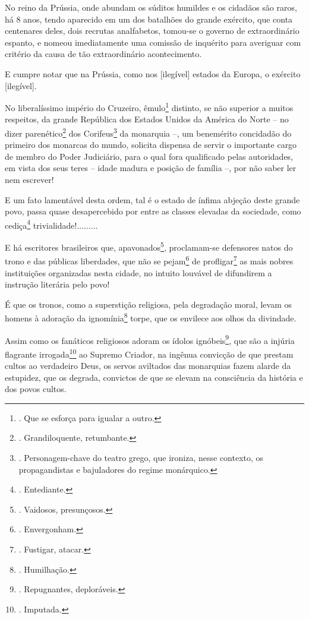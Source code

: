 No reino da Prússia, onde abundam os súditos humildes e os cidadãos são
raros, há 8 anos, tendo aparecido em um dos batalhões do grande
exército, que conta centenares deles, dois recrutas analfabetos,
tomou-se o governo de extraordinário espanto, e nomeou imediatamente uma
comissão de inquérito para averiguar com critério da causa de tão
extraordinário acontecimento.

E cumpre notar que na Prússia, como nos {[}ilegível{]} estados da
Europa, o exército {[}ilegível{]}.

No liberalíssimo império do Cruzeiro, êmulo\footnote{. Que se esforça
  para igualar a outro.} distinto, se não superior a muitos respeitos,
da grande República dos Estados Unidos da América do Norte -- no dizer
parenético\footnote{. Grandiloquente, retumbante.} dos
Corifeus\footnote{. Personagem-chave do teatro grego, que ironiza, nesse
  contexto, os propagandistas e bajuladores do regime monárquico.} da
monarquia --, um benemérito concidadão do primeiro dos monarcas do
mundo, solicita dispensa de servir o importante cargo de membro do Poder
Judiciário, para o qual fora qualificado pelas autoridades, em vista dos
seus teres -- idade madura e posição de família --, por não saber ler
nem escrever!

E um fato lamentável desta ordem, tal é o estado de ínfima abjeção deste
grande povo, passa quase desapercebido por entre as classes elevadas da
sociedade, como cediça\footnote{. Entediante.} trivialidade!.........

E há escritores brasileiros que, apavonados\footnote{. Vaidosos,
  presunçosos.}, proclamam-se defensores natos do trono e das públicas
liberdades, que não se pejam\footnote{. Envergonham.} de
profligar\footnote{. Fustigar, atacar.} as mais nobres instituições
organizadas nesta cidade, no intuito louvável de difundirem a instrução
literária pelo povo!

É que os tronos, como a superstição religiosa, pela degradação moral,
levam os homens à adoração da ignomínia\footnote{. Humilhação.} torpe,
que os envilece aos olhos da divindade.

Assim como os fanáticos religiosos adoram os ídolos ignóbeis\footnote{.
  Repugnantes, deploráveis.}, que são a injúria flagrante
irrogada\footnote{. Imputada.} ao Supremo Criador, na ingênua convicção
de que prestam cultos ao verdadeiro Deus, os servos aviltados das
monarquias fazem alarde da estupidez, que os degrada, convictos de que
se elevam na consciência da história e dos povos cultos.

